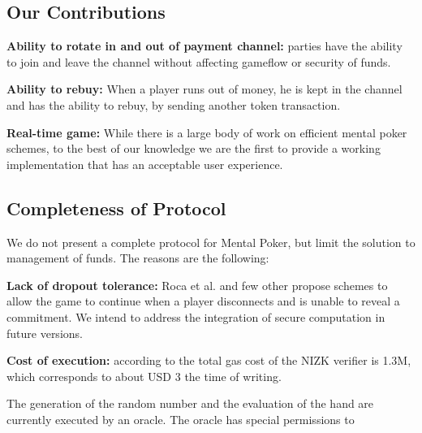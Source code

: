 \subsection{Our Contributions}
 
\textbf{Ability to rotate in and out of payment channel:} parties have the ability to join and leave the channel without affecting gameflow or security of funds.
 
\textbf{Ability to rebuy:} When a player runs out of money, he is kept in the channel and has the ability to rebuy, by sending another token transaction.

\textbf{Real-time game:} While there is a large body of work on efficient mental poker schemes, to the best of our knowledge we are the first to provide a working implementation that has an acceptable user experience.

\subsection{Completeness of Protocol}

We do not present a complete protocol for Mental Poker, but limit the solution to management of funds. The reasons are the following:
 
\textbf{Lack of dropout tolerance:} Roca et al. \cite{roca05} and few other propose schemes to allow the game to continue when a player disconnects and is unable to reveal a commitment. We intend to address the integration of secure computation in future versions.
 
\textbf{Cost of execution:} according to \cite{bentov17} the total gas cost of the NIZK verifier \cite{damgard06} is 1.3M, which corresponds to about USD 3 the time of writing.

The generation of the random number and the evaluation of the hand are currently executed by an oracle. The oracle has special permissions to 